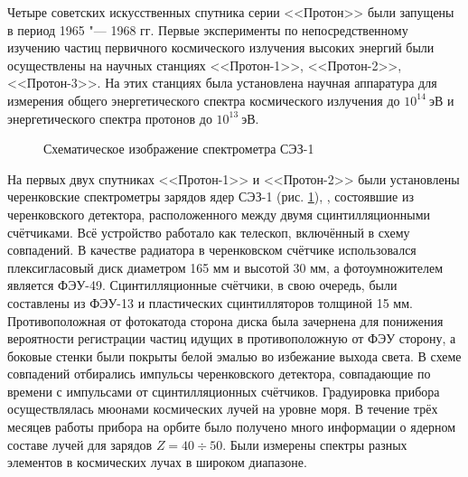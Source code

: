 \documentclass[12pt,a4paper]{report} %
\begin{document}
Четыре советских искусственных спутника серии <<Протон>> были запущены в период 1965 "--- 1968 гг.
Первые эксперименты по непосредственному изучению частиц первичного космического излучения высоких энергий были осуществлены на научных станциях <<Протон-1>>, <<Протон-2>>, <<Протон-3>>. На этих станциях была установлена научная аппаратура для измерения общего энергетического спектра космического излучения до $10^{14}~эВ$ и энергетического спектра протонов до $10^{13}~эВ$.
\begin{figure}[th]
	\noindent{}
	\caption{Схематическое изображение спектрометра СЭЗ-1}
	\label{figSEZ1}
\end{figure}
На первых двух спутниках <<Протон-1>> и <<Протон-2>> были установлены черенковские спектрометры зарядов ядер СЭЗ-1 (рис. \ref{figSEZ1}), \cite{SEZ1}, состоявшие из черенковского детектора, расположенного между двумя сцинтилляционными счётчиками. Всё устройство работало как телескоп, включённый в схему совпадений. 
В качестве радиатора в черенковском счётчике использовался плексигласовый диск диаметром 165 мм и высотой 30 мм, а фотоумножителем является ФЭУ-49. 
Сцинтилляционные счётчики, в свою очередь, были составлены из ФЭУ-13 и пластических сцинтилляторов толщиной 15 мм. 
Противоположная от фотокатода сторона диска была зачернена для понижения вероятности регистрации частиц идущих в противоположную от ФЭУ сторону, а боковые стенки были покрыты белой эмалью во избежание выхода света. 
В схеме совпадений отбирались импульсы черенковского детектора, совпадающие по времени с импульсами от сцинтилляционных счётчиков. 
Градуировка прибора осуществлялась мюонами космических лучей на уровне моря. 
В течение трёх месяцев работы прибора на орбите было получено много информации о ядерном составе лучей для зарядов $Z=40\div50$. Были измерены спектры разных элементов в космических лучах в широком диапазоне. 
\end{document}

